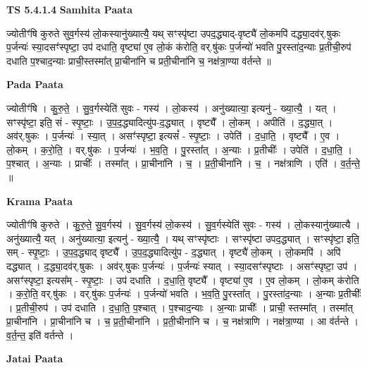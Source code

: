 \documentclass[17pt]{extarticle}
\begin{document}
\textbf{TS 5.4.1.4 } \newline
\textbf{Samhita Paata} \newline

ज्योतीꣳ॑षि कुरुते सुव॒र्गस्य॑ लो॒कस्यानु॑ख्यात्यै॒ यथ् सꣳस्पृ॑ष्टा उपद॒द्ध्याद्-वृष्ट्यै॑ लो॒कमपि॑ दद्ध्या॒दव॑र्.षुकः प॒र्जन्यः॑ स्या॒दसꣳ॑स्पृष्टा॒ उप॑ दधाति॒ वृष्ट्या॑ ए॒व लो॒कं क॑रोति॒ वर्.षु॑कः प॒र्जन्यो॑ भवति पु॒रस्ता॑द॒न्याः प्र॒तीची॒रुप॑ दधाति प॒श्चाद॒न्याः प्राची॒स्तस्मा᳚त् प्रा॒चीना॑नि च प्रती॒चीना॑नि च॒ नक्ष॑त्रा॒ण्या व॑र्तन्ते ॥ \newline

\textbf{Pada Paata} \newline

ज्योतीꣳ॑षि । कु॒रु॒ते॒ । सु॒व॒र्गस्येति॑ सुवः - गस्य॑ । लो॒कस्य॑ । अनु॑ख्यात्या॒ इत्यनु॑ - ख्या॒त्यै॒ । यत् । सꣳस्पृ॑ष्टा॒ इति॒ सं - स्पृ॒ष्टाः॒ । उ॒प॒द॒द्ध्यादित्यु॑प-द॒द्ध्यात् । वृष्ट्यै᳚ । लो॒कम् । अपीति॑ । द॒द्ध्या॒त् । अव॑र्.षुकः । प॒र्जन्यः॑ । स्या॒त् । असꣳ॑स्पृष्टा॒ इत्यसं᳚ - स्पृ॒ष्टाः॒ । उपेति॑ । द॒धा॒ति॒ । वृष्ट्यै᳚ । ए॒व । लो॒कम् । क॒रो॒ति॒ । वर्.षु॑कः । प॒र्जन्यः॑ । भ॒व॒ति॒ । पु॒रस्ता᳚त् । अ॒न्याः । प्र॒तीचीः᳚ । उपेति॑ । द॒धा॒ति॒ । प॒श्चात् । अ॒न्याः । प्राचीः᳚ । तस्मा᳚त् । प्रा॒चीना॑नि । च॒ । प्र॒ती॒चीना॑नि । च॒ । नक्ष॑त्राणि । एति॑ । व॒र्त॒न्ते॒ ॥  \newline


\textbf{Krama Paata} \newline

ज्योतीꣳ॑षि कुरुते । कु॒रु॒ते॒ सु॒व॒र्गस्य॑ । सु॒व॒र्गस्य॑ लो॒कस्य॑ । सु॒व॒र्गस्येति॑ सुवः - गस्य॑ । लो॒कस्यानु॑ख्यात्यै । अनु॑ख्यात्यै॒ यत् । अनु॑ख्यात्या॒ इत्यनु॑ - ख्या॒त्यै॒ । यथ् सꣳस्पृ॑ष्टाः । सꣳस्पृ॑ष्टा उपद॒द्ध्यात् । सꣳस्पृ॑ष्टा॒ इति॒ सम् - स्पृ॒ष्टाः॒ । उ॒प॒द॒द्ध्याद् वृष्ट्यै᳚ । उ॒प॒द॒द्ध्यादित्यु॑प - द॒द्ध्यात् । वृष्ट्यै॑ लो॒कम् । लो॒कमपि॑ । अपि॑ दद्ध्यात् । द॒द्ध्या॒दव॑र्.षुकः । अव॑र्.षुकः प॒र्जन्यः॑ । प॒र्जन्यः॑ स्यात् । स्या॒दसꣳ॑स्पृष्टाः । असꣳ॑स्पृष्टा॒ उप॑ । असꣳ॑स्पृष्टा॒ इत्यस᳚म् - स्पृ॒ष्टाः॒ । उप॑ दधाति । द॒धा॒ति॒ वृष्ट्यै᳚ । वृष्ट्या॑ ए॒व । ए॒व लो॒कम् । लो॒कम् क॑रोति । क॒रो॒ति॒ वर्.षु॑कः । वर्.षु॑कः प॒र्जन्यः॑ । प॒र्जन्यो॑ भवति । भ॒व॒ति॒ पु॒रस्ता᳚त् । पु॒रस्ता॑द॒न्याः । अ॒न्याः प्र॒तीचीः᳚ । प्र॒तीची॒रुप॑ । उप॑ दधाति । द॒धा॒ति॒ प॒श्चात् । प॒श्चाद॒न्याः । अ॒न्याः प्राचीः᳚ । प्राची॒ स्तस्मा᳚त् । तस्मा᳚त् प्रा॒चीना॑नि । प्रा॒चीना॑नि च । च॒ प्र॒ती॒चीना॑नि । प्र॒ती॒चीना॑नि च । च॒ नक्ष॑त्राणि । नक्ष॑त्रा॒ण्या । आ व॑र्तन्ते । व॒र्त॒न्त॒ इति॑ वर्तन्ते । \newline

\textbf{Jatai Paata} \newline
\end{document}
